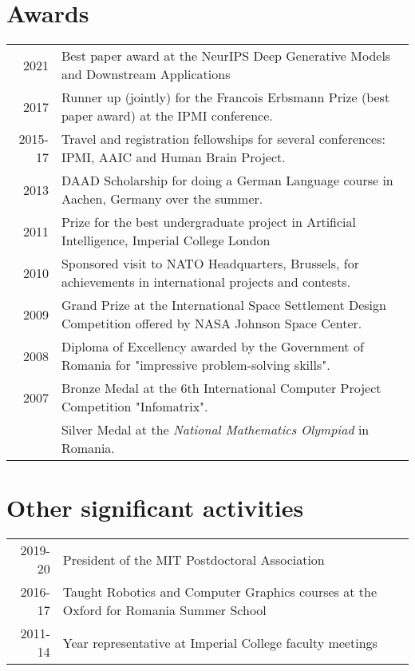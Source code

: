 \documentclass[a4paper,10pt]{article} %
\begin{document}

\section*{Awards}

\begin{tabular}{r|p{15.7cm}}
2021 & Best paper award at the NeurIPS Deep Generative Models and Downstream Applications\\
2017 & Runner up (jointly) for the Francois Erbsmann Prize (best paper award) at the IPMI conference.\\
2015-17 & Travel and registration fellowships for several conferences: IPMI, AAIC and Human Brain Project.\\
2013 & DAAD Scholarship for doing a German Language course in Aachen, Germany over the summer.\\
2011 & Prize for the best undergraduate project in Artificial Intelligence, Imperial College London\\
2010 & Sponsored visit to NATO Headquarters, Brussels, for achievements in international projects and contests.\\
2009 & Grand Prize at the International Space Settlement Design Competition offered by NASA Johnson Space Center.\\
2008 & Diploma of Excellency awarded by the Government of Romania for "impressive problem-solving skills".\\
2007 & Bronze Medal at the 6th International Computer Project Competition
"Infomatrix".\\
& Silver Medal at the \emph{National Mathematics Olympiad} in Romania.
\end{tabular}

\section*{Other significant activities}
\begin{tabular}{r|p{15cm}}
2019-20 & President of the MIT Postdoctoral Association\\
2016-17 & Taught Robotics and Computer Graphics courses at the Oxford for Romania Summer School\\
2011-14 & Year representative at Imperial College faculty meetings\\
\end{tabular}
\end{document}
